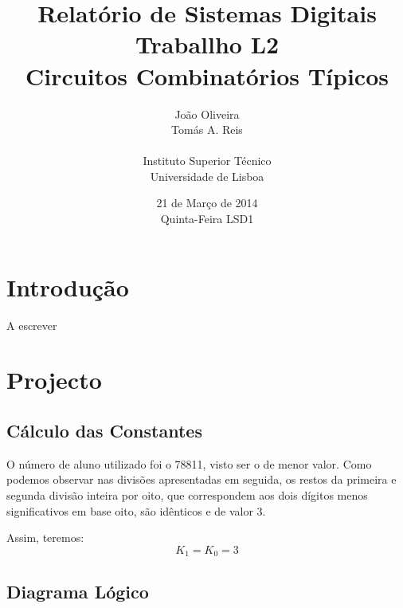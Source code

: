 \documentclass[a4paper,12pt]{article}
\begin{document}
\renewcommand{\sfdefault}{lmss}
\renewcommand{\familydefault}{\sfdefault}
\selectfont

\title{\bf Relatório de Sistemas Digitais \\
Traballho L2\\
Circuitos Combinatórios Típicos}
\author{João Oliveira\\
Tomás A. Reis\\
\\
Instituto Superior Técnico \\
Universidade de Lisboa}
\date{21 de Março de 2014 \\
Quinta-Feira LSD1}
\maketitle

\pagebreak
\section{Introdução}
A escrever


\section{Projecto}
\subsection{Cálculo das Constantes}
O número de aluno utilizado foi o 78811, visto ser o de menor valor. Como 
podemos observar nas divisões apresentadas em seguida, os restos da primeira e 
segunda divisão inteira por oito, que correspondem aos dois dígitos menos 
significativos em base oito, são idênticos e de valor 3. 
\par
\vspace*{1\baselineskip}
\:\:\:\:\:\: 
\vspace*{1\baselineskip}
\par
Assim, teremos:
\begin{equation}
K_1=K_0=3
\end{equation}
\subsection{Diagrama Lógico}
\end{document}
